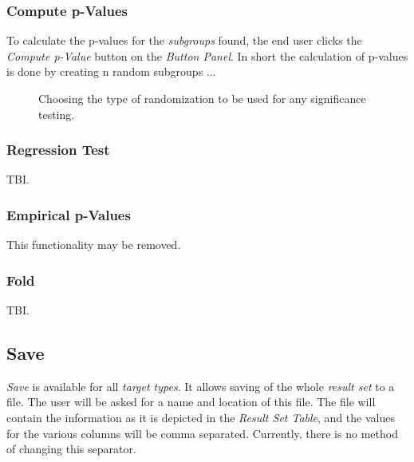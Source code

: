 \documentclass{article}
\begin{document}
\subsubsection{Compute p-Values}
\label{result-window:p}
To calculate the p-values for the \emph{subgroups} found, the end user clicks the \emph{Compute p-Value} button on the \emph{Button Panel}.
In short the calculation of p-values is done by creating n random subgroups ...

\begin{figure}
\begin{center}
\centering
{}
\caption{Choosing the type of randomization to be used for any significance testing.}
\end{center}
\label{fig:randomizationdialog}
\end{figure}



\subsubsection{Regression Test}
\label{result-window:regression}
TBI.



\subsubsection{Empirical p-Values}
\label{result-window:empirical-p}
This functionality may be removed.



\subsubsection{Fold}
\label{result-window:fold}
TBI.



\subsection{Save}
\label{result-window:save}
\emph{Save} is available for all \emph{target types}.
It allows saving of the whole \emph{result set} to a file.
The user will be asked for a name and location of this file.
The file will contain the information as it is depicted in the \emph{Result Set Table}, and the values for the various columns will be comma separated.
Currently, there is no method of changing this separator.
\end{document}
